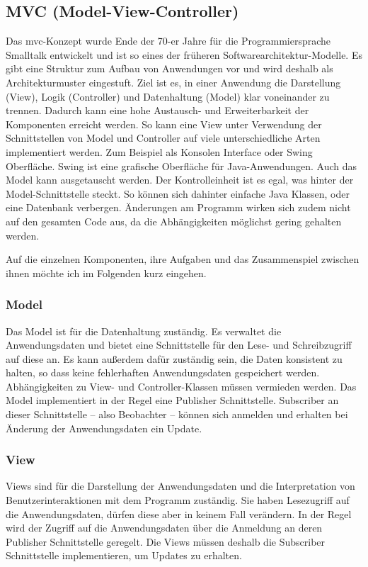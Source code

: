 \documentclass[
							a4paper, 
							11pt, 
							openany, 
							liststotoc,
							parskip=half, 
   							headings=normal
						]{scrreprt}
\begin{document}
{\subsection{MVC (Model-View-Controller)} \label{sse:grundlagen_mvc}
Das \acs{mvc}-Konzept wurde Ende der 70-er Jahre für die Programmiersprache Smalltalk entwickelt und ist so eines der früheren Softwarearchitektur-Modelle.
Es gibt eine Struktur zum Aufbau von Anwendungen vor und wird deshalb als Architekturmuster eingestuft.\cite{openbook:mvc}\newline
Ziel ist es, in einer Anwendung die Darstellung (View), Logik (Controller) und Datenhaltung (Model) klar voneinander zu trennen. Dadurch kann eine hohe Austausch- und Erweiterbarkeit der Komponenten erreicht werden.\cite{wiki:mvc}\newline
So kann eine View unter Verwendung der Schnittstellen von Model und Controller auf viele unterschiedliche Arten implementiert werden. Zum Beispiel als Konsolen Interface oder Swing Oberfläche. Swing ist eine grafische Oberfläche für Java-Anwendungen. Auch das Model kann ausgetauscht werden. Der Kontrolleinheit ist es egal, was hinter der Model-Schnittstelle steckt. So können sich dahinter einfache Java Klassen, oder eine Datenbank verbergen. Änderungen am Programm wirken sich zudem nicht auf den gesamten Code aus, da die Abhängigkeiten möglichst gering gehalten werden.

Auf die einzelnen Komponenten, ihre Aufgaben und das Zusammenspiel zwischen ihnen möchte ich im Folgenden kurz eingehen.

\subsubsection{Model} \label{ssse:grundlagen_mvc_model}
Das Model ist für die Datenhaltung zuständig. Es verwaltet die Anwendungsdaten und bietet eine Schnittstelle für den Lese- und Schreibzugriff auf diese an. Es kann außerdem dafür zuständig sein, die Daten konsistent zu halten, so dass keine fehlerhaften Anwendungsdaten gespeichert werden.\newline
Abhängigkeiten zu View- und Controller-Klassen müssen vermieden werden. Das Model implementiert in der Regel eine Publisher Schnittstelle. Subscriber an dieser Schnittstelle -- also Beobachter -- können sich anmelden und erhalten bei Änderung der Anwendungsdaten ein Update.\cite{wiki:mvc}

\subsubsection{View} \label{ssse:grundlagen_mvc_view}
Views sind für die Darstellung der Anwendungsdaten und die Interpretation von Benutzerinteraktionen mit dem Programm zuständig. Sie haben Lesezugriff auf die Anwendungsdaten, dürfen diese aber in keinem Fall verändern.\newline
In der Regel wird der Zugriff auf die Anwendungsdaten über die Anmeldung an deren Publisher Schnittstelle geregelt. Die Views müssen deshalb die Subscriber Schnittstelle implementieren, um Updates zu erhalten. \cite{wiki:mvc}

}
\end{document}
